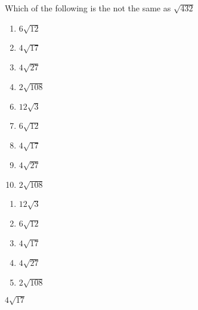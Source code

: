 



 Which of the following is the not the same as $\sqrt{432}$


\ifsat
	\begin{enumerate}[label=\Alph*)]
		\item  $6\sqrt{12}$
		\item  $4\sqrt{17}$%
		\item  $4\sqrt{27}$
		\item   $2\sqrt{108}$
	\end{enumerate}
\else
\fi

\ifacteven
	\begin{enumerate}[label=\textbf{\Alph*.},itemsep=\fill,align=left]
		\setcounter{enumii}{5}
		\item   $12\sqrt{3}$
		\item  $6\sqrt{12}$
		\item  $4\sqrt{17}$%
		\addtocounter{enumii}{1}
		\item  $4\sqrt{27}$
		\item   $2\sqrt{108}$
	\end{enumerate}
\else
\fi

\ifactodd
	\begin{enumerate}[label=\textbf{\Alph*.},itemsep=\fill,align=left]
		\item   $12\sqrt{3}$
		\item  $6\sqrt{12}$
		\item  $4\sqrt{17}$%
		\item  $4\sqrt{27}$
		\item   $2\sqrt{108}$
	\end{enumerate}
\else
\fi

\ifgridin
  $4\sqrt{17}$%
		
\else
\fi

